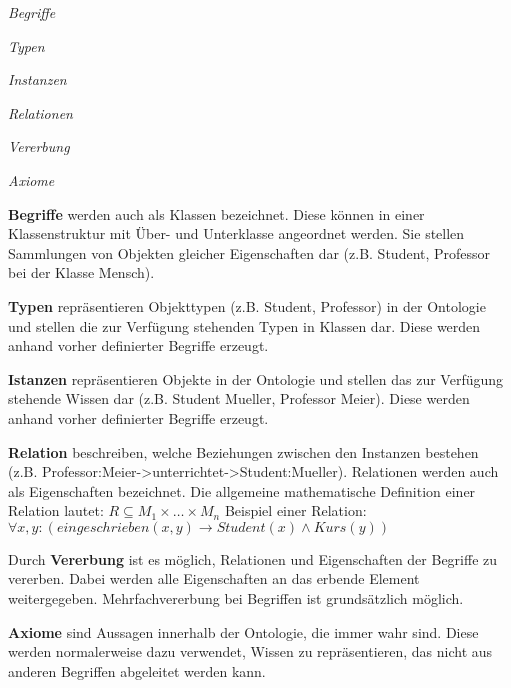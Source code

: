  \begin{compactenum}[I]
     \item \textit{Begriffe}
     \item \textit{Typen}
     \item \textit{Instanzen}
     \item \textit{Relationen}
     \item \textit{Vererbung}
     \item \textit{Axiome}
   \end{compactenum}
   
   \textbf{Begriffe} werden auch als Klassen bezeichnet. Diese
   k{\"o}nnen in einer Klassenstruktur mit {\"U}ber- und Unterklasse angeordnet
   werden. Sie stellen Sammlungen von Objekten gleicher Eigenschaften dar
   (z.B. Student, Professor bei der Klasse Mensch).
   
   \textbf{Typen} repr{\"a}sentieren Objekttypen (z.B. Student, Professor) in
   der Ontologie und stellen die zur Verf{\"u}gung stehenden Typen in Klassen dar.
   Diese werden anhand vorher definierter Begriffe erzeugt.
   
   \textbf{Istanzen} repr{\"a}sentieren Objekte in
   der Ontologie und stellen das zur Verf{\"u}gung stehende Wissen dar
   (z.B. Student Mueller, Professor Meier). Diese werden anhand vorher
   definierter Begriffe erzeugt.
   
   \textbf{Relation} beschreiben, welche Beziehungen zwischen den Instanzen
   bestehen (z.B. Professor:Meier->unterrichtet->Student:Mueller). Relationen
   werden auch als Eigenschaften bezeichnet. 
   \newline
   Die allgemeine mathematische Definition einer Relation lautet:
   \newline    \newline
   $R \subseteq M_1 \times \ldots \times M_n$
   \newline
   Beispiel einer Relation:
   \newline    \newline
   $\forall x,y : (eingeschrieben(x,y) \rightarrow Student(x) \wedge Kurs(y))$
   
   Durch \textbf{Vererbung} ist es m{\"o}glich, Relationen und Eigenschaften der
   Begriffe zu vererben. Dabei werden alle Eigenschaften an das erbende Element
   weitergegeben. Mehrfachvererbung bei Begriffen ist grunds{\"a}tzlich
   m{\"o}glich.
   
   \textbf{Axiome} sind Aussagen innerhalb der Ontologie, die immer wahr sind.
   Diese werden normalerweise dazu verwendet, Wissen zu repr{\"a}sentieren, das
   nicht aus anderen Begriffen abgeleitet werden kann.
   

